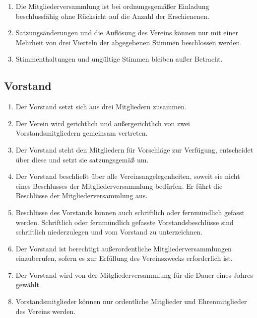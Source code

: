 \documentclass[12pt,a4paper,draft]{article}
\begin{document}
\begin{enumerate}
\item Die Mitgliederversammlung ist bei ordnungsgemäßer Einladung 
beschlussfähig ohne Rücksicht auf die Anzahl der Erschienenen.

\item Satzungsänderungen und die Auflösung des Vereins können nur mit einer 
Mehrheit von drei Vierteln der abgegebenen Stimmen beschlossen werden. 

\item Stimmenthaltungen und ungültige Stimmen bleiben außer Betracht.
\end{enumerate}

\subsection{Vorstand} %
\begin{enumerate}
\item Der Vorstand setzt sich aus drei Mitgliedern zusammen. %

\item Der Verein wird gerichtlich und außergerichtlich von zwei 
Vorstandsmitgliedern gemeinsam vertreten.

\item Der Vorstand steht den Mitgliedern für Vorschläge zur Verfügung, 
entscheidet über diese und setzt sie satzungsgemäß um.

\item Der Vorstand beschließt über alle Vereinsangelegenheiten, soweit sie 
nicht eines Beschlusses der Mitgliederversammlung bedürfen. Er führt die 
Beschlüsse der Mitgliederversammlung aus.

\item Beschlüsse des Vorstands können auch schriftlich oder fernmündlich 
gefasst werden. Schriftlich oder fernmündlich gefasste Vorstandsbeschlüsse 
sind schriftlich niederzulegen und vom Vorstand zu unterzeichnen.

\item Der Vorstand ist berechtigt außerordentliche Mitgliederversammlungen 
einzuberufen, sofern es zur Erfüllung des Vereinszwecks erforderlich ist.

\item Der Vorstand wird von der Mitgliederversammlung für die Dauer eines 
Jahres gewählt.

\item Vorstandsmitglieder können nur ordentliche Mitglieder und Ehrenmitglieder 
des Vereins werden.


\end{enumerate}
\end{document}
